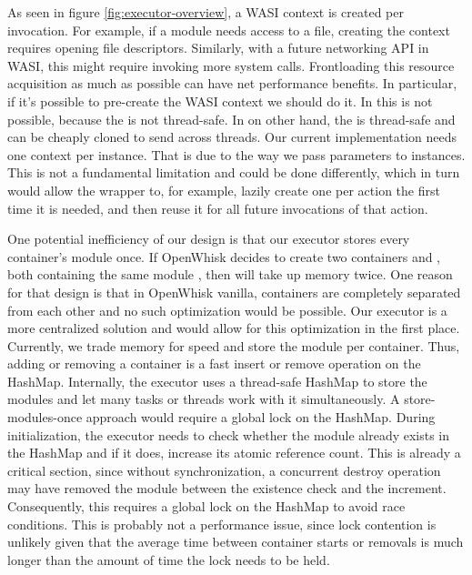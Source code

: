 As seen in figure \ref{fig:executor-overview}, a WASI context is created per  invocation. For example, if a module needs access to a file, creating the context requires opening file descriptors. Similarly, with a future networking API in WASI, this might require invoking more system calls. Frontloading this resource acquisition as much as possible can have net performance benefits. In particular, if it's possible to pre-create the WASI context we should do it. In  this is not possible, because the  is not thread-safe. In  on other hand, the  is thread-safe and can be cheaply cloned to send across threads. Our current implementation needs one context per instance. That is due to the way we pass parameters to instances. This is not a fundamental limitation and could be done differently, which in turn would allow the  wrapper to, for example, lazily create one  per action the first time it is needed, and then reuse it for all future invocations of that action.

One potential inefficiency of our design is that our executor stores every container's module once. If OpenWhisk decides to create two containers  and , both containing the same module , then  will take up memory twice. One reason for that design is that in OpenWhisk vanilla, containers are completely separated from each other and no such optimization would be possible. Our executor is a more centralized solution and would allow for this optimization in the first place. Currently, we trade memory for speed and store the module per container. Thus, adding or removing a container is a fast insert or remove operation on the HashMap.
Internally, the executor uses a thread-safe HashMap to store the modules and let many tasks or threads work with it simultaneously. A store-modules-once approach would require a global lock on the HashMap. During initialization, the executor needs to check whether the module already exists in the HashMap and if it does, increase its atomic reference count. This is already a critical section, since without synchronization, a concurrent destroy operation may have removed the module between the existence check and the increment. Consequently, this requires a global lock on the HashMap to avoid race conditions. This is probably not a performance issue, since lock contention is unlikely given that the average time between container starts or removals is much longer than the amount of time the lock needs to be held.

